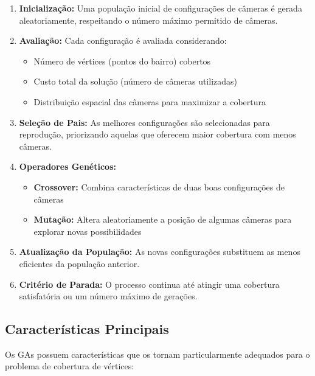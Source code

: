 \documentclass[12pt, a4paper]{report}
\begin{document}
\begin{enumerate}
    \item \textbf{Inicialização:} Uma população inicial de configurações de câmeras é gerada aleatoriamente, respeitando o número máximo permitido de câmeras.
    
    \item \textbf{Avaliação:} Cada configuração é avaliada considerando:
    \begin{itemize}
        \item Número de vértices (pontos do bairro) cobertos
        \item Custo total da solução (número de câmeras utilizadas)
        \item Distribuição espacial das câmeras para maximizar a cobertura
    \end{itemize}
    
    \item \textbf{Seleção de Pais:} As melhores configurações são selecionadas para reprodução, priorizando aquelas que oferecem maior cobertura com menos câmeras.
    
    \item \textbf{Operadores Genéticos:}
    \begin{itemize}
        \item \textbf{Crossover:} Combina características de duas boas configurações de câmeras
        \item \textbf{Mutação:} Altera aleatoriamente a posição de algumas câmeras para explorar novas possibilidades
    \end{itemize}
    
    \item \textbf{Atualização da População:} As novas configurações substituem as menos eficientes da população anterior.
    
    \item \textbf{Critério de Parada:} O processo continua até atingir uma cobertura satisfatória ou um número máximo de gerações.
\end{enumerate}

\subsection{Características Principais}
Os GAs possuem características que os tornam particularmente adequados para o problema de cobertura de vértices:
\end{document}
